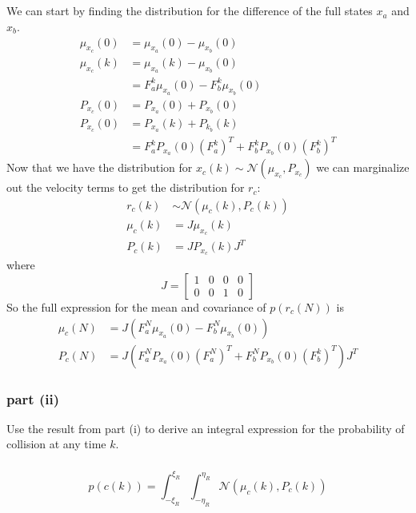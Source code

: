 \documentclass[11pt]{article}
\begin{document}
\subparagraph*{}
We can start by finding the distribution for the difference of the full states $x_a$ and $x_b$. 
\begin{align*}
	\mu_{x_c}(0) &= \mu_{x_a}(0) - \mu_{x_b}(0) \\
	\mu_{x_c}(k) &= \mu_{x_a}(k) - \mu_{x_b}(0) \\
	&= F_a^k\mu_{x_a}(0) - F_b^k\mu_{x_b}(0) \\
	P_{x_c}(0) &= P_{x_a}(0) + P_{x_b}(0) \\
	P_{x_c}(0) &= P_{x_a}(k) + P_{k_b}(k) \\
	&= F_a^k P_{x_a}(0) (F_a^k)^T + F_b^k P_{x_b}(0) (F_b^k)^T
\end{align*}
Now that we have the distribution for $x_c(k)\sim\mathcal{N}(\mu_{x_c},P_{x_c})$ we can marginalize out the velocity terms to get the distribution for $r_c$:
\begin{align*}
	r_c(k) &\sim \mathcal{N}(\mu_c(k),P_c(k)) \\
	\mu_c(k) &= J\mu_{x_c}(k) \\
	P_c(k) &= JP_{x_c}(k)J^T
\end{align*}
where
\begin{equation*}
	J = \begin{bmatrix} 1&0&0&0\\0&0&1&0 \end{bmatrix}  
\end{equation*}
So the full expression for the mean and covariance of $p(r_c(N))$ is
\begin{align*}
	\mu_c(N) &= J(F_a^N\mu_{x_a}(0)-F_b^N\mu_{x_b}(0)) \\
	P_c(N) &= J(F_a^NP_{x_a}(0)(F_a^N)^T + F_b^NP_{x_b}(0)(F_b^k)^T)J^T
\end{align*}

\subsubsection*{part (ii)}
Use the result from part (i) to derive an integral expression for the probability of collision at any time $k$.

\subparagraph*{}
\begin{equation*}
	p(c(k))=\int_{-\xi_R}^{\xi_R}\int_{-\eta_R}^{\eta_R}\mathcal{N}(\mu_c(k),P_c(k))
\end{equation*}
\end{document}
